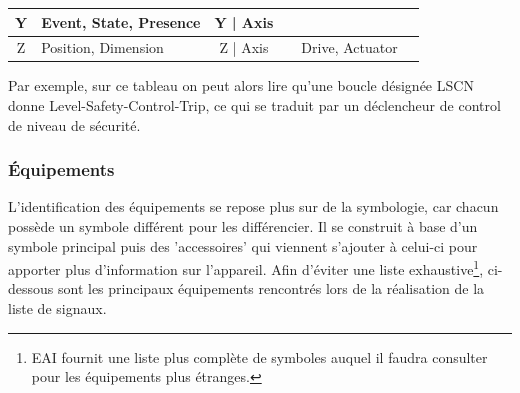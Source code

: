 \documentclass[11pt, openright]{book}
\begin{document}
\begin{table}[ht!]
{\begin{tabular}{|c|l|c|c|c|c|}
            \hline
            Y                                             & Event, State, Presence                                     & Y | Axis                                                 &                                                                     &                                                        &                                                          \\
            \hline
            Z                                             & Position, Dimension                                        & Z | Axis                                                 &                                                                     & Drive, Actuator                                        &                                                          \\
            \hline
        \end{tabular}}
\end{table}

Par exemple, sur ce tableau on peut alors lire qu’une boucle désignée LSCN donne Level-Safety-Control-Trip, ce qui se traduit par un déclencheur de control de niveau de sécurité.

\subsubsection{Équipements}

L'identification des équipements se repose plus sur de la symbologie, car chacun possède un symbole différent pour les différencier. Il se construit à base d'un symbole principal puis des 'accessoires' qui viennent s'ajouter à celui-ci pour apporter plus d'information sur l'appareil. Afin d'éviter une liste exhaustive\footnote{EAI fournit une liste plus complète de symboles auquel il faudra consulter pour les équipements plus étranges.}, ci-dessous sont les principaux équipements rencontrés lors de la réalisation de la liste de signaux.
\end{document}
